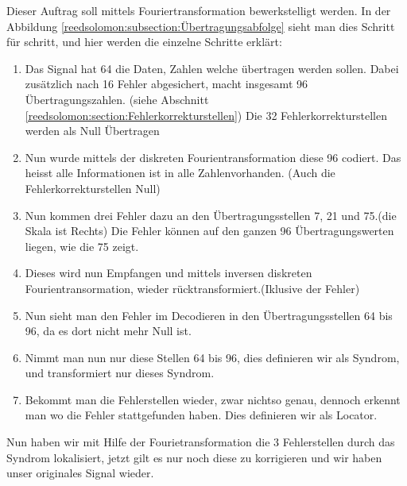 Dieser Auftrag soll mittels Fouriertransformation bewerkstelligt werden. 
In der Abbildung \ref{reedsolomon:subsection:Übertragungsabfolge} sieht man dies Schritt für schritt,
und hier werden die einzelne Schritte erklärt:
\begin{enumerate}[(1)]
\item Das Signal hat 64 die Daten, Zahlen welche übertragen werden sollen. 
Dabei zusätzlich nach 16 Fehler abgesichert, macht insgesamt 96 Übertragungszahlen.
(siehe Abschnitt \ref{reedsolomon:section:Fehlerkorrekturstellen})
Die 32 Fehlerkorrekturstellen werden als Null Übertragen
\item Nun wurde mittels der diskreten Fourientransformation diese 96 codiert.
Das heisst alle Informationen ist in alle Zahlenvorhanden. (Auch die Fehlerkorrekturstellen Null)
\item Nun kommen drei Fehler dazu an den Übertragungsstellen 7, 21 und 75.(die Skala ist Rechts)
Die Fehler können auf den ganzen 96 Übertragungswerten liegen, wie die 75 zeigt.
\item Dieses wird nun Empfangen und mittels inversen diskreten Fourientransormation, wieder rücktransformiert.(Iklusive der Fehler)
\item Nun sieht man den Fehler im Decodieren in den Übertragungsstellen 64 bis 96, da es dort nicht mehr Null ist.
\item Nimmt man nun nur diese Stellen 64 bis 96, dies definieren wir als Syndrom, und transformiert nur dieses Syndrom.
\item Bekommt man die Fehlerstellen wieder, zwar nichtso genau, dennoch erkennt man wo die Fehler stattgefunden haben. 
Dies definieren wir als Locator.
\end{enumerate}
Nun haben wir mit Hilfe der Fourietransformation die 3 Fehlerstellen durch das Syndrom lokalisiert, 
jetzt gilt es nur noch diese zu korrigieren und wir haben unser originales Signal wieder.

